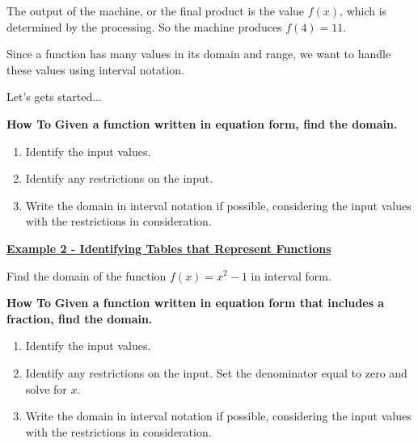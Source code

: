 \documentclass[12pt]{book}
\begin{document}
The output of the machine, or the final product is the value $f(x)$, which is determined by the processing. So the machine produces $f(4)=11$.
\vspace{2mm}

Since a function has many values in its domain and range, we want to handle these values using interval notation. 
\vspace{2mm}

Let's gets started...

    \newpage
 \begin{comment}
     \underline{\textbf{Example 2 - Finding the Domain of a Function as a Set of Ordered Pairs}}
   
    Find the domain and range of the following function: $$\{ (2,10), (3,10), (4,20), (5,30), (6,40)\}$$
    \vspace{5mm}
    Domain: 
   
    Range: 
 \end{comment}  

\begin{boxR}
    \textbf{How To}
    \vspace{1mm}
    \hline
    \vspace{2mm}
    \textbf{Given a function written in equation form, find the domain.}
    \begin{enumerate}
        \item Identify the input values.
        \item Identify any restrictions on the input.
        \item Write the domain in interval notation if possible, considering the input values with the restrictions in consideration.
    \end{enumerate}
\end{boxR}
\vspace{1mm}

\underline{\textbf{Example 2 - Identifying Tables that Represent Functions}}

Find the domain of the function $f(x)=x^2-1$ in interval form.

\vspace{35mm}

\begin{boxR}
    \textbf{How To}
    \vspace{1mm}
    \hline
    \vspace{2mm}
    \textbf{Given a function written in equation form that includes a fraction, find the domain.}
    \begin{enumerate}
        \item Identify the input values.
        \item Identify any restrictions on the input. Set the denominator equal to zero and solve for $x$.
        \item Write the domain in interval notation if possible, considering the input values with the restrictions in consideration.
    \end{enumerate}
\end{boxR}
\vspace{1mm}
\end{document}

